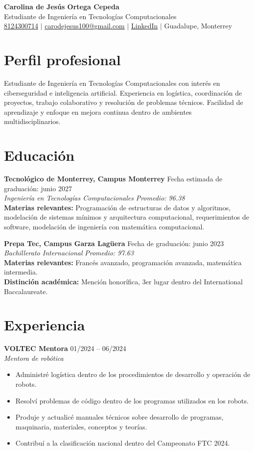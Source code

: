 \documentclass[10pt,letterpaper]{article}
\newcommand{\resumeSubheading}[4]{
  \textbf{#1} \hfill #2 \\
  \textit{#3} \hfill \textit{#4} \\
}
\newcommand{\resumeItem}[1]{\item #1}
\begin{document}
\begin{center}
    {\LARGE \textbf{Carolina de Jesús Ortega Cepeda}} \\
    \vspace{2pt}
    Estudiante de Ingeniería en Tecnologías Computacionales \\
    \vspace{3pt}
    \href{tel:8124300714}{8124300714} $|$
    \href{mailto:carodejesus100@gmail.com}{carodejesus100@gmail.com} $|$
    \href{https://www.linkedin.com/in/caro-ortega-cepeda-83ba3424b}{LinkedIn} $|$
    Guadalupe, Monterrey
\end{center}

\section{Perfil profesional}
Estudiante de Ingeniería en Tecnologías Computacionales con interés en ciberseguridad e inteligencia artificial. Experiencia en logística, coordinación de proyectos, trabajo colaborativo y resolución de problemas técnicos. Facilidad de aprendizaje y enfoque en mejora continua dentro de ambientes multidisciplinarios.

\section{Educación}
\resumeSubheading
{Tecnológico de Monterrey, Campus Monterrey}{Fecha estimada de graduación: junio 2027}
{Ingeniería en Tecnologías Computacionales}{Promedio: 96.38}
\textbf{Materias relevantes:} Programación de estructuras de datos y algoritmos, modelación de sistemas mínimos y arquitectura computacional, requerimientos de software, modelación de ingeniería con matemática computacional.

\vspace{4pt}
\resumeSubheading
{Prepa Tec, Campus Garza Lagüera}{Fecha de graduación: junio 2023}
{Bachillerato Internacional}{Promedio: 97.63}
\textbf{Materias relevantes:} Francés avanzado, programación avanzada, matemática intermedia. \\
\textbf{Distinción académica:} Mención honorífica, 3er lugar dentro del International Baccalaureate.

\section{Experiencia}
\resumeSubheading
{VOLTEC Mentora}{01/2024 -- 06/2024}
{Mentora de robótica}{ }
\begin{itemize}
    \resumeItem{Administré logística dentro de los procedimientos de desarrollo y operación de robots.}
    \resumeItem{Resolví problemas de código dentro de los programas utilizados en los robots.}
    \resumeItem{Produje y actualicé manuales técnicos sobre desarrollo de programas, maquinaria, materiales, conceptos y teorías.}
    \resumeItem{Contribuí a la clasificación nacional dentro del Campeonato FTC 2024.}
\end{itemize}
\end{document}
